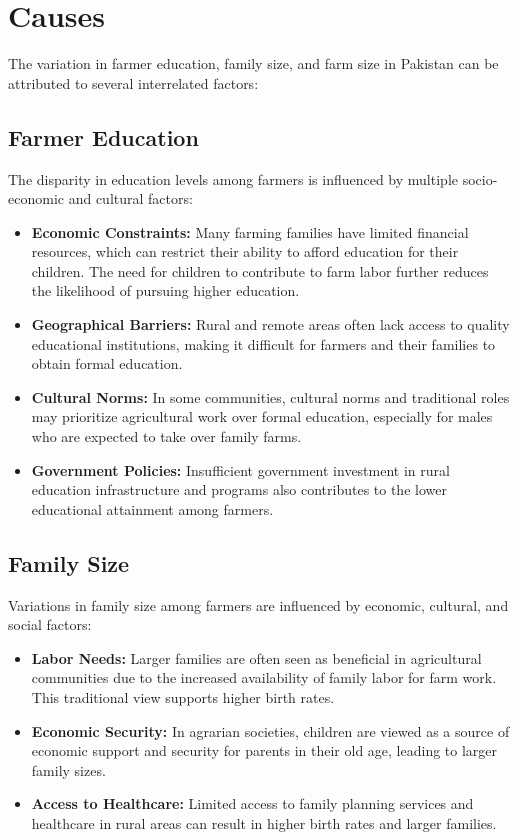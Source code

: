 \documentclass[12pt]{article}
\begin{document}
\section{Causes}
The variation in farmer education, family size, and farm size in Pakistan can be attributed to several interrelated factors:

\subsection*{Farmer Education}
The disparity in education levels among farmers is influenced by multiple socio-economic and cultural factors:
\begin{itemize}
    \item \textbf{Economic Constraints:} Many farming families have limited financial resources, which can restrict their ability to afford education for their children. The need for children to contribute to farm labor further reduces the likelihood of pursuing higher education.
    \item \textbf{Geographical Barriers:} Rural and remote areas often lack access to quality educational institutions, making it difficult for farmers and their families to obtain formal education.
    \item \textbf{Cultural Norms:} In some communities, cultural norms and traditional roles may prioritize agricultural work over formal education, especially for males who are expected to take over family farms.
    \item \textbf{Government Policies:} Insufficient government investment in rural education infrastructure and programs also contributes to the lower educational attainment among farmers.
\end{itemize}

\subsection*{Family Size}
Variations in family size among farmers are influenced by economic, cultural, and social factors:
\begin{itemize}
    \item \textbf{Labor Needs:} Larger families are often seen as beneficial in agricultural communities due to the increased availability of family labor for farm work. This traditional view supports higher birth rates.
    \item \textbf{Economic Security:} In agrarian societies, children are viewed as a source of economic support and security for parents in their old age, leading to larger family sizes.
    \item \textbf{Access to Healthcare:} Limited access to family planning services and healthcare in rural areas can result in higher birth rates and larger families.
\end{itemize}
\end{document}
